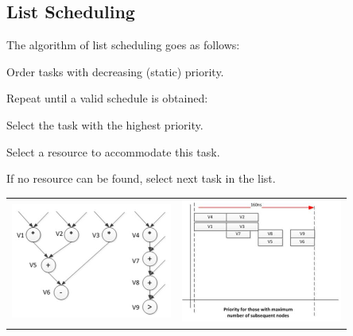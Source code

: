 	\subsection{List Scheduling}
		The algorithm of list scheduling goes as follows:
		
		\begin{compactenum}
			\item Order tasks with decreasing (static) priority.
			\item Repeat until a valid schedule is obtained:
			\begin{compactenum}
			  \item Select the task with the highest priority.
			  \item Select a resource to accommodate this task.
			  \item If no resource can be found, select next task in the list.
			\end{compactenum}
		\end{compactenum}
		
		\begin{table}[H]\centering
			\begin{tabular}{p{0.425\linewidth}p{0.425\linewidth}}
				\includegraphics[scale=0.8]{./pictures/listSchedDiag.png}
				& \includegraphics[scale=0.8]{./pictures/listSched.png}\\
			\end{tabular}
		\end{table}

